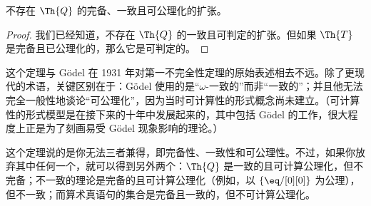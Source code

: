 \documentclass[../../../include/open-logic-section]{subfiles}
\begin{document}


\begin{thm}
不存在 $\Th{Q}$ 的完备、一致且可公理化的扩张。
\end{thm}

\begin{proof}
我们已经知道，不存在 $\Th{Q}$ 的一致且可判定的扩张。但如果 $\Th{T}$ 是完备且已公理化的，那么它是可判定的。
\end{proof}

\begin{explain}
这个定理与 Gödel 在 1931 年对第一不完全性定理的原始表述相去不远。除了更现代的术语，关键区别在于：Gödel 使用的是“$\omega$-一致的”而非“一致的”；并且他无法完全一般性地谈论“可公理化”，因为当时可计算性的形式概念尚未建立。（可计算性的形式模型是在接下来的十年中发展起来的，其中包括 Gödel 的工作，很大程度上正是为了刻画易受 Gödel 现象影响的理论。）

这个定理说的是你无法三者兼得，即完备性、一致性和可公理性。不过，如果你放弃其中任何一个，就可以得到另外两个：$\Th{Q}$ 是一致的且可计算公理化，但不完备；不一致的理论是完备的且可计算公理化（例如，以 $\{ \eq/[0][0] \}$ 为公理），但不一致；而算术真语句的集合是完备且一致的，但不可计算公理化。
\end{explain}
\end{document}
